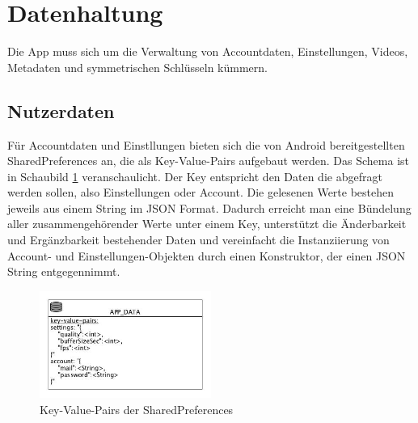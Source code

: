 \section{Datenhaltung}
Die App muss sich um die Verwaltung von Accountdaten, Einstellungen, Videos, Metadaten und symmetrischen Schlüsseln kümmern. 

\subsection{Nutzerdaten}
Für Accountdaten und  Einstllungen bieten sich die von Android bereitgestellten SharedPreferences an, die als Key-Value-Pairs aufgebaut werden. Das Schema ist in Schaubild \ref{fig:sharedpreferences_overview} veranschaulicht. Der Key entspricht den Daten die abgefragt werden sollen, also Einstellungen oder Account. Die gelesenen Werte bestehen jeweils aus einem String im JSON Format. Dadurch erreicht man eine Bündelung aller zusammengehörender Werte unter einem Key, unterstützt die Änderbarkeit und Ergänzbarkeit bestehender Daten und vereinfacht die Instanziierung von Account- und Einstellungen-Objekten durch einen Konstruktor, der einen JSON String entgegennimmt.\newline\par

\begin{figure}[ht]
	\centering
\includegraphics[width=0.5\textwidth]{./resources/Diagramme/App/SharedPreferences_overview.jpg}
\caption{Key-Value-Pairs der SharedPreferences}
	\label{fig:sharedpreferences_overview}
\end{figure}

